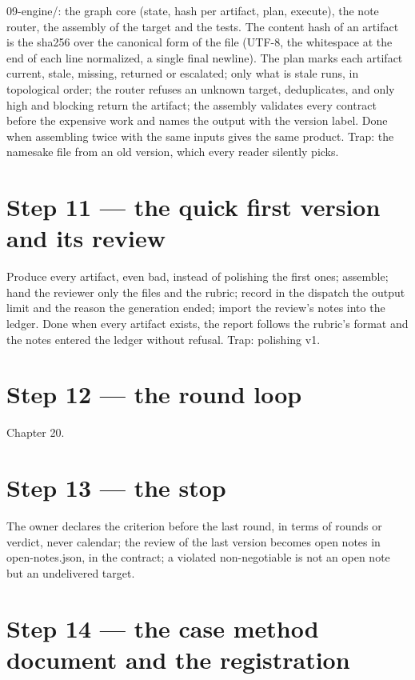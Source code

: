 \documentclass[
  american,
  10pt,
]{report}
\renewcommand{\texttt}[1]{{\ttfamily\hyphenchar\font=-1 #1}}
\begin{document}
\texttt{09-\allowbreak{}engine/\allowbreak{}}: the graph core (state,
hash per artifact, plan, execute), the note router, the assembly of the
target and the tests. The content hash of an artifact is the sha256 over
the canonical form of the file (UTF-8, the whitespace at the end of each
line normalized, a single final newline). The plan marks each artifact
\texttt{current}, \texttt{stale}, \texttt{missing}, \texttt{returned} or
\texttt{escalated}; only what is stale runs, in topological order; the
router refuses an unknown target, deduplicates, and only high and
blocking return the artifact; the assembly validates every contract
before the expensive work and names the output with the version label.
Done when assembling twice with the same inputs gives the same product.
Trap: the namesake file from an old version, which every reader silently
picks.

\section{Step 11 --- the quick first version and its
review}\label{step-11-the-quick-first-version-and-its-review}

Produce every artifact, even bad, instead of polishing the first ones;
assemble; hand the reviewer only the files and the rubric; record in the
dispatch the output limit and the reason the generation ended; import
the review's notes into the ledger. Done when every artifact exists, the
report follows the rubric's format and the notes entered the ledger
without refusal. Trap: polishing v1.

\section{Step 12 --- the round loop}\label{step-12-the-round-loop}

Chapter 20.

\section{Step 13 --- the stop}\label{step-13-the-stop}

The owner declares the criterion before the last round, in terms of
rounds or verdict, never calendar; the review of the last version
becomes open notes in
\texttt{open-\allowbreak{}notes.\allowbreak{}json}, in the contract; a
violated non-negotiable is not an open note but an undelivered target.

\section{Step 14 --- the case method document and the
registration}\label{step-14-the-case-method-document-and-the-registration}
\end{document}
